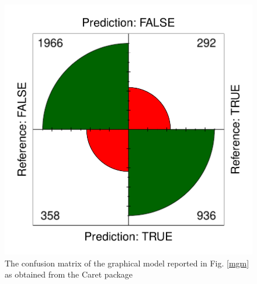 \documentclass[12pt,%
               a4paper,%
               oneside,openany,%
               titlepage,%
               headinclude,footinclude,%
               BCOR5mm,%
               cleardoublepage=empty,%
               tablecaptionabove,%
               floatperchapter,
               ]{scrreprt}                 %
\begin{document}
\begin{figure}[h]
\begin{center}
\includegraphics[width=1\textwidth]{Figures/mgm_confusion.pdf}
\caption{The confusion matrix of the graphical model reported in Fig. \ref{mgm} as obtained from the Caret package \cite{kuhn2008building,caret}} 
\label{mgm_confusion}
\end{center}
\end{figure}
\end{document}
